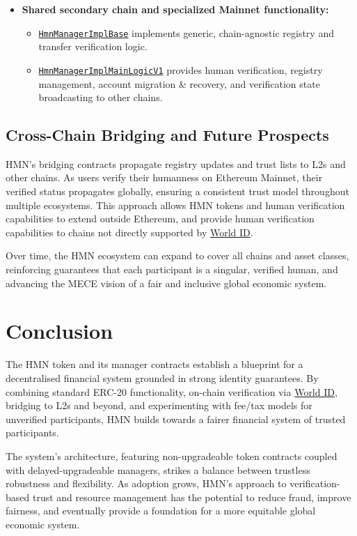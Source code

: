 \documentclass[12pt,a4paper]{article}
\begin{document}
\begin{itemize}
    \item \textbf{Shared secondary chain and specialized Mainnet functionality:}
          \begin{itemize}
              \item \texttt{\href{https://github.com/hmn-is/hmn-contracts/blob/main/src/HmnManagerImplBase.sol}{HmnManagerImplBase}} implements generic, chain-agnostic registry and transfer verification logic.
              \item \texttt{\href{https://github.com/hmn-is/hmn-contracts/blob/main/src/HmnManagerImplMainLogicV1.sol}{HmnManagerImplMainLogicV1}} provides human verification, registry management, account migration \& recovery, and verification state broadcasting to other chains.
          \end{itemize}
\end{itemize}

\subsection{Cross-Chain Bridging and Future Prospects}
HMN's bridging contracts propagate registry updates and trust lists to L2s and other chains.
As users verify their humanness on Ethereum Mainnet, their verified status propagates globally, ensuring a consistent trust model throughout multiple ecosystems.
This approach allows HMN tokens and human verification capabilities to extend outside Ethereum, and provide human verification capabilities to chains not directly supported by \href{https://world.org/world-id}{World ID}.

Over time, the HMN ecosystem can expand to cover all chains and asset classes, reinforcing guarantees that each participant is a singular, verified human, and advancing the MECE vision of a fair and inclusive global economic system.

\section{Conclusion}
The HMN token and its manager contracts establish a blueprint for a decentralised financial system grounded in strong identity guarantees.
By combining standard ERC-20 functionality, on-chain verification via \href{https://world.org/world-id}{World ID}, bridging to L2s and beyond, and experimenting with fee/tax models for unverified participants, HMN builds towards a fairer financial system of trusted participants.

The system's architecture, featuring non-upgradeable token contracts coupled with delayed-upgradeable managers, strikes a balance between trustless robustness and flexibility.
As adoption grows, HMN's approach to verification-based trust and resource management has the potential to reduce fraud, improve fairness, and eventually provide a foundation for a more equitable global economic system.
\end{document}
